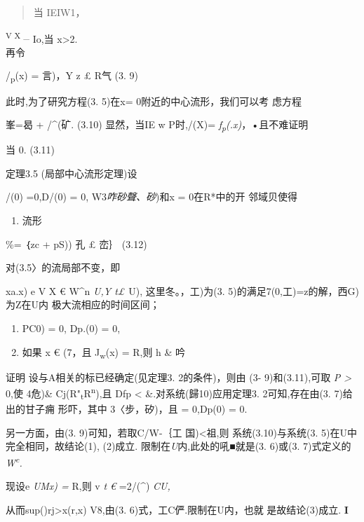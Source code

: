 \documentclass{article}
\begin{document}
\begin{quote}
当 IEIW1，
\end{quote}

\textsuperscript{V X \_} Io,当
\textbar{}\textbar{}x\textbar{}\textbar{}\textgreater{}2.\\
再令

/\textsubscript{p}(x) = 言)，Y z £ R气 (3. 9)

此时,为了研究方程(3. 5)在x= 0附近的中心流形，我们可以考 虑方程

峯=曷 + /\^{}(矿. (3.10) 显然，当IE w P时,/(X)=
\emph{f\textsubscript{p}(.x)}，•且不难证明

当 0. (3.11)

定理3.5 (局部中心流形定理)设

/(0) =0,D/(0) = 0, W3\emph{咋砂聲、砂})和x = 0在R*中的开 邻域贝使得

\begin{enumerate}
\def\labelenumi{(\arabic{enumi})}
\item
  流形
\end{enumerate}

\%= ｛zc + pS)) \textbar{} 孔 £ 峦｝ (3.12)

对(3.5〉的流局部不变，即

xa.x) e V X € W\^{}n \emph{U,Y t£} U), 这里冬。，工)为(3.
5)的满足7(0,工)=z的解，西G)为Z在U内 极大流相应的时间区间；

\begin{enumerate}
\def\labelenumi{(\arabic{enumi})}
\setcounter{enumi}{1}
\item
  PC0) = 0, Dp.(0) = 0,
\item
  如果 x € (7，且 J\textsubscript{w}(x) = R,则 h \& 吟
\end{enumerate}

证明 设与A相关的标已经确定(见定理3. 2的条件)，则由 (3- 9)和(3.11),可取
\emph{P \textgreater{}} 0,使 4危)\&
Cj(R"\textsubscript{t}R\textsuperscript{n}),且
\textbar{}{]}Dfp\textbar{}\textbar{} \textless{}
\&.对系统(歸10)应用定理3. 2可知,存在由(3. 7)给出的甘子痈 形吓，其中
3〈步，矽)，且 = 0,Dp(0) = 0.

另一方面，由(3. 9)可知，若取C/W-｛工\textbar{}
\textbar{}国)\textless{}祖,则 系统(3.10)与系统(3.
5)在U中完全相同，故结论(1), (2)成立. 限制在\emph{U}内,此处的吼■就是(3.
6)或(3. 7)式定义的\emph{W\textsuperscript{c}.}

现设e \emph{UMx) =} R,则 v \emph{t €} =2/(\^{}) \emph{CU,}

从而sup()rj\textgreater{}x(r,x)\textbar{} V8,由(3.
6)式，工C俨.限制在U内，也就 是故结论(3)成立. \textbf{I}
\end{document}
